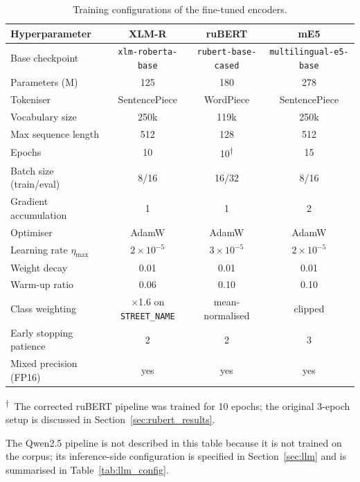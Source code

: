 \begin{table}[H]
\centering
\caption{Training configurations of the fine-tuned encoders.}
\label{tab:configs}
\small
\setlength{\tabcolsep}{4pt}
\renewcommand{\arraystretch}{1.15}

\begin{tabular}{>{\raggedright\arraybackslash}p{4cm}ccc}
\toprule
\textbf{Hyperparameter} & \textbf{XLM-R} & \textbf{ruBERT} & \textbf{mE5} \\
\midrule
Base checkpoint        & \texttt{xlm-roberta-base} & \texttt{rubert-base-cased} & \texttt{multilingual-e5-base} \\
Parameters (M)         & 125  & 180  & 278 \\
Tokeniser              & SentencePiece & WordPiece & SentencePiece \\
Vocabulary size        & 250k & 119k & 250k \\
Max sequence length    & 512  & 128  & 512 \\
Epochs                 & 10   & 10\textsuperscript{$\dagger$} & 15 \\
Batch size (train/eval)& 8/16 & 16/32 & 8/16 \\
Gradient accumulation  & 1    & 1    & 2 \\
Optimiser              & AdamW & AdamW & AdamW \\
Learning rate $\eta_{\max}$ & $2{\times}10^{-5}$ & $3{\times}10^{-5}$ & $2{\times}10^{-5}$ \\
Weight decay           & 0.01 & 0.01 & 0.01 \\
Warm-up ratio          & 0.06 & 0.10 & 0.10 \\
Class weighting        & $\times$1.6 on \texttt{STREET\_NAME} & mean-normalised & clipped \\
Early stopping patience& 2    & 2    & 3 \\
Mixed precision (FP16) & yes  & yes  & yes \\
\bottomrule
\end{tabular}

\vspace{2pt}
\footnotesize\textsuperscript{$\dagger$}~The corrected ruBERT pipeline was trained for 10 epochs; the original 3-epoch setup is discussed in Section~\ref{sec:rubert_results}.
\end{table}

The Qwen2.5 pipeline is not described in this table because it is not trained on the corpus; its inference-side configuration is specified in Section~\ref{sec:llm} and is summarised in Table~\ref{tab:llm_config}.


